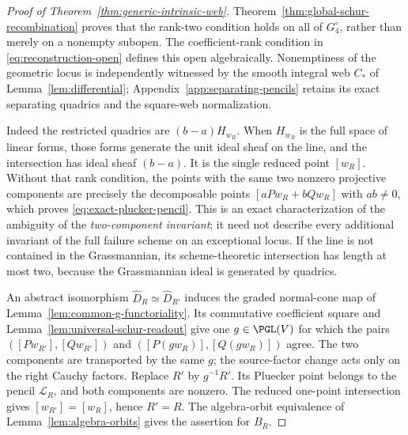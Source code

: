 \begin{proof}[Proof of Theorem~\ref{thm:generic-intrinsic-web}]
Theorem~\ref{thm:global-schur-recombination} proves that the
rank-two condition holds on all of \(G_4^\circ\), rather than
merely on a nonempty subopen.  The coefficient-rank condition in
\eqref{eq:reconstruction-open} defines this open algebraically.  Nonemptiness of the geometric
locus is independently witnessed by the smooth integral web
\(C_*\) of Lemma~\ref{lem:differential}; Appendix~\ref{app:separating-pencils}
retains its exact separating quadrics and the square-web normalization.

Indeed the restricted quadrics are \((b-a)H_{w_R}\).
When \(H_{w_R}\) is the full space of linear forms, those
forms generate the unit ideal sheaf on the line, and the
intersection has ideal sheaf \((b-a)\).  It is the single
reduced point \([w_R]\).  Without that rank condition,
the points with the same two nonzero projective components are
precisely the decomposable points \([aPw_R+bQw_R]\) with
\(ab\ne0\), which proves \eqref{eq:exact-plucker-pencil}.
This is an exact characterization of the ambiguity of the
\emph{two-component invariant}; it need not describe every
additional invariant of the full failure scheme on an exceptional
locus.  If the line is not contained in the Grassmannian, its
scheme-theoretic intersection has length at most two, because the
Grassmannian ideal is generated by quadrics.

An abstract isomorphism \(\widehat D_R\simeq\widehat D_{R'}\)
induces the graded normal-cone map of
Lemma~\ref{lem:common-g-functoriality}.  Its commutative coefficient
square and Lemma~\ref{lem:universal-schur-readout} give one
\(g\in\PGL(V)\) for which the pairs
\(([Pw_{R'}],[Qw_{R'}])\) and
\(([P(gw_R)],[Q(gw_R)])\) agree.  The two components are
transported by the same \(g\); the source-factor change acts only
on the right Cauchy factors.  Replace \(R'\) by
\(g^{-1}R'\).  Its Pluecker point belongs to the pencil
\(\mathscr L_R\), and both components are nonzero.  The reduced
one-point intersection gives \([w_{R'}]=[w_R]\), hence
\(R'=R\).  The algebra-orbit equivalence of
Lemma~\ref{lem:algebra-orbits} gives the assertion for \(B_R\).
\end{proof}

